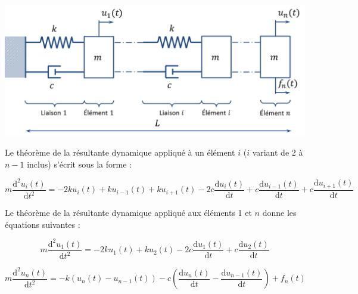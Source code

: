\documentclass[10pt]{article}
\begin{document}
\begin{center}
\includegraphics[width=.9\textwidth]{images/structure}
\end{center}


Le théorème de la résultante dynamique appliqué à un élément $i$ ($i$ variant de 2 à $n-1$ inclus) s'écrit sous la forme : 



\begin{equation}
m\dfrac{\text{d}^2u_i(t)}{\text{d}t^2} = 
- 2 k u_i(t)  + k u_{i-1}(t) + k u_{i+1}(t)
- 2c \dfrac{\text{d}u_i(t)}{\text{d}t}   +c \dfrac{\text{d}u_{i-1}(t)}{\text{d}t} +c \dfrac{\text{d}u_{i+1}(t)}{\text{d}t}
\end{equation}

Le théorème de la résultante dynamique appliqué aux éléments 1 et $n$ donne les équations suivantes : 
%


\begin{equation}
m\dfrac{\text{d}^2u_1(t)}{\text{d}t^2} = 
- 2k u_1(t) + k u_2 (t) 
-2c \dfrac{\text{d}u_1(t)}{\text{d}t} 
+ c \dfrac{\text{d}u_2(t)}{\text{d}t} 
\end{equation}

\begin{equation}
m\dfrac{\text{d}^2u_n(t)}{\text{d}t^2} = 
-k\left(u_n(t)-u_{n-1}(t) \right)   - c\left(\dfrac{\text{d}u_{n}(t)}{\text{d}t}-\dfrac{\text{d}u_{n-1}(t)}{\text{d}t} \right) +f_n(t)
\end{equation}
\end{document}
